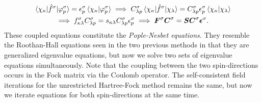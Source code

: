             \begin{gather}
                \mel*{\chi_{\kappa}}{\hat{f}^{\sigma}}{\varphi^{\sigma}_{p}}
                = \epsilon^{\sigma}_{p}
                \braket*{\chi_{\kappa}}{\varphi^{\sigma}_{p}}
                \implies
                C^{\sigma}_{\lambda p}
                \mel*{\chi_{\kappa}}{\hat{f}^{\sigma}}{\chi_{\lambda}}
                = C^{\sigma}_{\lambda p} \epsilon^{\sigma}_{p}
                \braket*{\chi_{\kappa}}{\chi_{\lambda}}
                \\
                \implies
                f^{\sigma}_{\kappa \lambda}
                C^{\sigma}_{\lambda p}
                =
                s_{\kappa\lambda}
                C^{\sigma}_{\lambda p}
                \epsilon^{\sigma}_{p}
                \implies
                \boldsymbol{F}^{\sigma}
                \boldsymbol{C}^{\sigma}
                =
                \boldsymbol{S}
                \boldsymbol{C}^{\sigma}
                \boldsymbol{\epsilon}^{\sigma}.
                \label{eq:pople-nesbet}
            \end{gather}
            These coupled equations constitute the \emph{Pople-Nesbet
            equations}.
            They resemble the Roothan-Hall equations seen in the two previous
            methods in that they are generalized eigenvalue equations, but now
            we solve two sets of eigenvalue equations simultaneously.
            Note that the coupling between the two spin-directions occurs in the
            Fock matrix via the Coulomb operator.
            The self-consistent field iterations for the unrestricted
            Hartree-Fock method remains the same, but now we iterate equations
            for both spin-directions at the same time.

